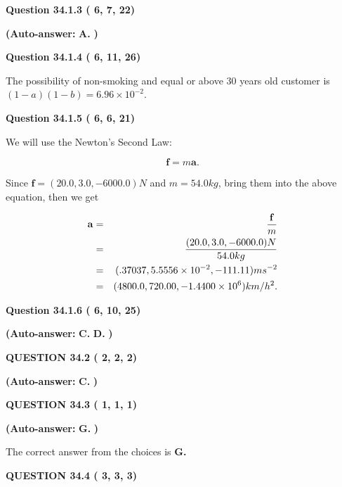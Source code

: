 \documentclass[12pt]{article}
\begin{document}
 
  
  
{\textbf{\large{Question
34.1.3 
 (          6,          7,         22)
}}}
 
 
{\textbf{(Auto-answer:}}
{\textbf{\large{
A.}}}
{\textbf{)}}
 
 
  
  
{\textbf{\large{Question
34.1.4 
 (          6,         11,         26)
}}}

The possibility of  %
 non-smoking and  %
equal or above 30 years old
customer is $ (1-a)(1-b) =  %
6.96 \times 10^{-2} $.
  
  
{\textbf{\large{Question
34.1.5 
 (          6,          6,         21)
}}}

We will use the Newton's Second Law:
 
\[
\mathbf{f}=m\mathbf{a}.
\]
 
Since $\mathbf{f}=( %
20.0,  %
3.0,  %
-6000.0 )N$
and $m= %
54.0 kg$, bring them into the above equation, then we get
 
\begin{eqnarray*}
\mathbf{a}&=&\frac{\mathbf{f}}m  \\
&=&\frac{(
20.0 ,
3.0 ,
-6000.0 )N
}{ %
54.0 kg}  \\
&=&(
.37037 ,
5.5556 \times 10^{-2},
-111.11
)ms^{-2} \\
&=&(
4800.0 ,
720.00 ,
-1.4400 \times 10^{6}
)km/h^2.
\end{eqnarray*}
 
  
  
{\textbf{\large{Question
34.1.6 
 (          6,         10,         25)
}}}
 
 
{\textbf{(Auto-answer:}}
{\textbf{\large{
C.}}}
{\textbf{\large{
D.}}}
{\textbf{)}}
 
 
  
  
{\textbf{\large{QUESTION
34.2 
 (          2,          2,          2)
}}}
 
 
{\textbf{(Auto-answer:}}
{\textbf{\large{
C.}}}
{\textbf{)}}
 
 
  
  
{\textbf{\large{QUESTION
34.3 
 (          1,          1,          1)
}}}
 
 
{\textbf{(Auto-answer:}}
{\textbf{\large{
G.}}}
{\textbf{)}}
 
 

The correct answer from the choices is
{\textbf{\large{
G.}}}
 
  
  
{\textbf{\large{QUESTION
34.4 
 (          3,          3,          3)
}}}
 
\end{document}
